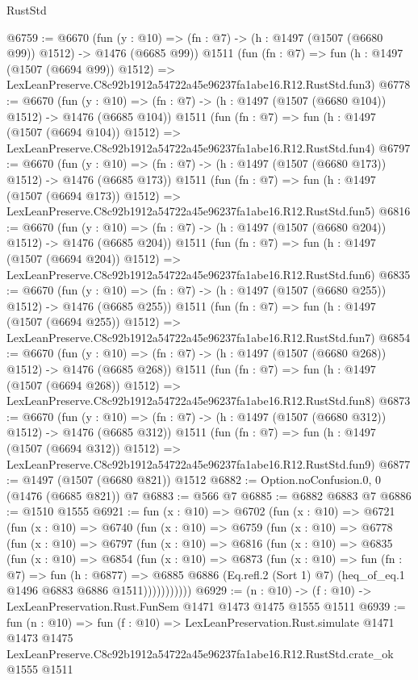 \begin{lexlean}{RustStd}
\begin{coremodule}
@6759 := @6670
    (fun (y : @10) => (fn : @7) -> (h : @1497 (@1507 (@6680 @99)) @1512) -> @1476 (@6685 @99))
    @1511
    (fun (fn : @7) =>
    fun (h : @1497 (@1507 (@6694 @99)) @1512) =>
    LexLeanPreserve.C8c92b1912a54722a45e96237fa1abe16.R12.RustStd.fun3)
@6778 := @6670
    (fun (y : @10) => (fn : @7) -> (h : @1497 (@1507 (@6680 @104)) @1512) -> @1476 (@6685 @104))
    @1511
    (fun (fn : @7) =>
    fun (h : @1497 (@1507 (@6694 @104)) @1512) =>
    LexLeanPreserve.C8c92b1912a54722a45e96237fa1abe16.R12.RustStd.fun4)
@6797 := @6670
    (fun (y : @10) => (fn : @7) -> (h : @1497 (@1507 (@6680 @173)) @1512) -> @1476 (@6685 @173))
    @1511
    (fun (fn : @7) =>
    fun (h : @1497 (@1507 (@6694 @173)) @1512) =>
    LexLeanPreserve.C8c92b1912a54722a45e96237fa1abe16.R12.RustStd.fun5)
@6816 := @6670
    (fun (y : @10) => (fn : @7) -> (h : @1497 (@1507 (@6680 @204)) @1512) -> @1476 (@6685 @204))
    @1511
    (fun (fn : @7) =>
    fun (h : @1497 (@1507 (@6694 @204)) @1512) =>
    LexLeanPreserve.C8c92b1912a54722a45e96237fa1abe16.R12.RustStd.fun6)
@6835 := @6670
    (fun (y : @10) => (fn : @7) -> (h : @1497 (@1507 (@6680 @255)) @1512) -> @1476 (@6685 @255))
    @1511
    (fun (fn : @7) =>
    fun (h : @1497 (@1507 (@6694 @255)) @1512) =>
    LexLeanPreserve.C8c92b1912a54722a45e96237fa1abe16.R12.RustStd.fun7)
@6854 := @6670
    (fun (y : @10) => (fn : @7) -> (h : @1497 (@1507 (@6680 @268)) @1512) -> @1476 (@6685 @268))
    @1511
    (fun (fn : @7) =>
    fun (h : @1497 (@1507 (@6694 @268)) @1512) =>
    LexLeanPreserve.C8c92b1912a54722a45e96237fa1abe16.R12.RustStd.fun8)
@6873 := @6670
    (fun (y : @10) => (fn : @7) -> (h : @1497 (@1507 (@6680 @312)) @1512) -> @1476 (@6685 @312))
    @1511
    (fun (fn : @7) =>
    fun (h : @1497 (@1507 (@6694 @312)) @1512) =>
    LexLeanPreserve.C8c92b1912a54722a45e96237fa1abe16.R12.RustStd.fun9)
@6877 := @1497 (@1507 (@6680 @821)) @1512
@6882 := Option.noConfusion.{0, 0} (@1476 (@6685 @821)) @7
@6883 := @566 @7
@6885 := @6882 @6883 @7
@6886 := @1510 @1555
@6921 := fun (x : @10) =>
  @6702
    (fun (x : @10) =>
    @6721
      (fun (x : @10) =>
      @6740
        (fun (x : @10) =>
        @6759
          (fun (x : @10) =>
          @6778
            (fun (x : @10) =>
            @6797
              (fun (x : @10) =>
              @6816
                (fun (x : @10) =>
                @6835
                  (fun (x : @10) =>
                  @6854
                    (fun (x : @10) =>
                    @6873
                      (fun (x : @10) =>
                      fun (fn : @7) =>
                      fun (h : @6877) =>
                      @6885
                        @6886
                        (Eq.refl.{2} (Sort 1) @7)
                        (heq_of_eq.{1} @1496 @6883 @6886 @1511)))))))))))
@6929 := (n : @10) -> (f : @10) -> LexLeanPreservation.Rust.FunSem @1471 @1473 @1475 @1555 @1511
@6939 := fun (n : @10) =>
  fun (f : @10) =>
  LexLeanPreservation.Rust.simulate
    @1471
    @1473
    @1475
    LexLeanPreserve.C8c92b1912a54722a45e96237fa1abe16.R12.RustStd.crate_ok
    @1555
    @1511
\end{coremodule}
\end{lexlean}
